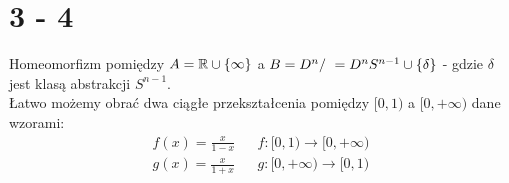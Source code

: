 \section{3 - 4}
Homeomorfizm pomiędzy $ A = {\mathbb{R}} \cup \{\infty\}$ a $B = D^n / ~ = D^n \\ S^{n-1} \cup \{ \delta \}$ - gdzie $\delta$ jest klasą abstrakcji $S^{n-1}$. \\


Łatwo możemy obrać dwa ciągłe przekształcenia pomiędzy $[0, 1)$ a $[0, +\infty)$ dane wzorami:
\begin{align*}
  f(x) = \tfrac{x}{1 - x} & & f : [0, 1) \to [0, +\infty) \\
  g(x) = \tfrac{x}{1 + x} & & g : [0, +\infty) \to [0, 1)
\end{align*}

\newpage
